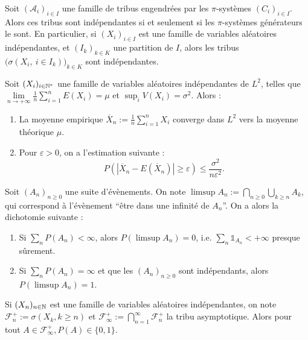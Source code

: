 \documentclass[11pt,a4paper]{article}
\begin{document}
\begin{thmstar}
[Coalitions] Soit $(\mathcal{A}_i)_{i\in I}$ une famille de tribus engendrées par les $\pi$-systèmes $(C_i)_{i\in I}$. Alors ces tribus sont indépendantes si et seulement si les $\pi$-systèmes générateurs le sont. En particulier, si $(X_i)_{i\in I}$ est une famille de variables aléatoires indépendantes, et $(I_k)_{k\in K}$ une partition de $I$, alors les tribus $\big(\sigma\left(X_i,\ i\in I_k\right)\big)_{k\in K}$ sont indépendantes.
\end{thmstar}

\begin{thmstar}
 Soit $(X_i)_{i\in \mathbb N^*}$ une famille de variables aléatoires indépendantes de $L^2$, telles que $\lim\limits_{n\to +\infty} \frac{1}{n}\sum_{i=1}^n E(X_i) = \mu$ et $\sup_i V(X_i) = \sigma^2$. Alors : 
\begin{enumerate}
\item La moyenne empirique $\displaystyle \overline{X}_n := \frac{1}{n}\sum_{i=1}^n X_i$ converge dans $L^2$ vers la moyenne théorique $\mu$.
\item Pour $\varepsilon >0$, on a l'estimation suivante : \[P(|\overline{X}_n - E(\overline{X}_n)| \geq \varepsilon) \leq \frac{\sigma^2}{n\varepsilon^2}.\]
\end{enumerate}
\end{thmstar}

\begin{lemmastar}
 Soit $(A_n)_{n\geq 0}$ une suite d'évènements. On note $\limsup A_n := \displaystyle \bigcap_{n\geq 0} \bigcup_{k\geq n} A_k$, qui correspond à l'évènement ``être dans une infinité de $A_n$''. On a alors la dichotomie suivante :
\begin{enumerate}
\item Si $\displaystyle \sum_n P(A_n) < \infty$, alors $P(\limsup A_n)=0$, i.e. $\sum_n \mathds{1}_{A_n} < +\infty$ presque sûrement.
\item Si $\displaystyle \sum_n P(A_n) = \infty$ et que les $(A_n)_{n\geq 0}$ sont indépendants, alors $P(\limsup A_n)=1$.
\end{enumerate}
\end{lemmastar}

\begin{thmstar}
[Loi du 0-1] Si $(X_n)_{n\in\mathbb N}$ est une famille de variables aléatoires indépendantes, on note $\mathcal{F}_n^+ := \sigma(X_k, k\geq n)$ et $\displaystyle \mathcal{F}_\infty^+ := \bigcap_{n=1}^\infty \mathcal{F}_n^+$ la tribu asymptotique. Alors pour tout $A\in \mathcal{F}_\infty^+,  P(A)\in \{0,1\}$.
\end{thmstar}
\end{document}
